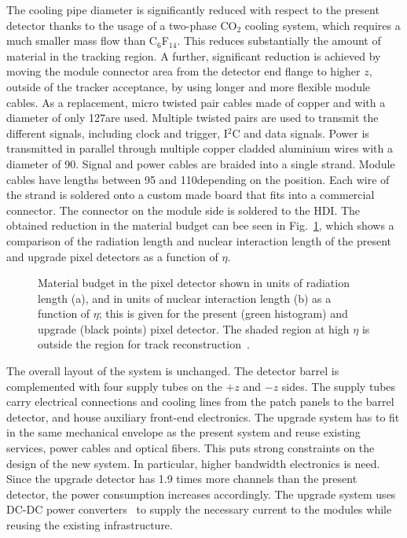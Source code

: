 The cooling pipe diameter is significantly reduced with respect to the present detector thanks to the usage of a two-phase CO$_2$ cooling system, which requires a much smaller mass flow than C$_6$F$_{14}$.
This reduces substantially the amount of material in the tracking region. A further, significant reduction is achieved by moving the module connector area from the detector end flange to higher $z$, outside of the tracker acceptance, by using longer and more flexible module cables. As a replacement, micro twisted pair cables made of copper and with a diameter of only 127\mum are used.
Multiple twisted pairs are used to transmit the different signals, including clock and trigger, I$^2$C and data signals. Power is transmitted in parallel through multiple copper cladded aluminium wires with a diameter of 90\mum. Signal and power cables are braided into a single strand. Module cables have lengths between 95 and 110\cm depending on the position. Each wire of the strand is soldered onto a custom made board that fits into a commercial connector. The connector on the module side is soldered to the HDI.
The obtained reduction in the material budget can bee seen in Fig.~\ref{fig:Phase1Budget}, which shows a comparison of the radiation length and nuclear interaction length of the present and upgrade pixel detectors as a function of $\eta$.

\begin{figure}[!htb]
 \begin{center}
 \end{center}
 \caption{Material budget in the pixel detector shown in units of radiation length (a), and in units of nuclear interaction length (b) as a function of $\eta$; this is given for the present (green histogram) and upgrade (black points) pixel detector. The shaded region at high $\eta$ is outside the region for track reconstruction~\cite{Dominguez:1481838}.}
 \label{fig:Phase1Budget}
\end{figure}

The overall layout of the system is unchanged. The detector barrel is complemented with four supply tubes on the $+z$ and $-z$ sides. The supply tubes carry electrical connections and cooling lines from the patch panels to the barrel detector, and house auxiliary front-end electronics. The upgrade system has to fit in the same mechanical envelope as the present system and reuse existing services, power cables and optical fibers. This puts strong constraints on the design of the new system. In particular, higher bandwidth electronics is need. Since the upgrade detector has 1.9 times more channels than the present detector, the power consumption increases accordingly. The upgrade system uses DC-DC power converters~\cite{1748-0221-10-01-C01052} to supply the necessary current to the modules while reusing the existing infrastructure.

